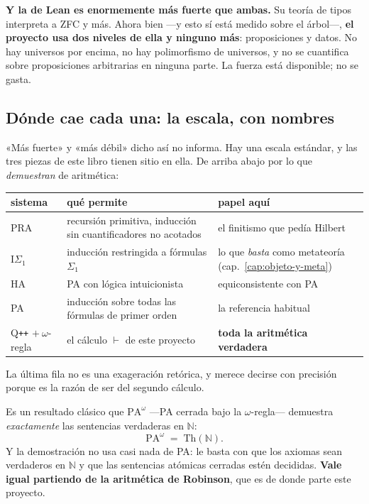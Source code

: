 \textbf{Y la de Lean es enormemente más fuerte que ambas.} Su teoría de tipos interpreta a ZFC y
más. Ahora bien —y esto sí está medido sobre el árbol—, \textbf{el proyecto usa dos niveles de ella
y ninguno más}: proposiciones y datos. No hay universos por encima, no hay polimorfismo de
universos, y no se cuantifica sobre proposiciones arbitrarias en ninguna parte. La fuerza está
disponible; no se gasta.

\subsection*{Dónde cae cada una: la escala, con nombres}

«Más fuerte» y «más débil» dicho así no informa. Hay una escala estándar, y las tres piezas de este
libro tienen sitio en ella. De arriba abajo por lo que \emph{demuestran} de aritmética:

\begin{center}\small
\begin{tabularx}{\linewidth}{@{}l >{\raggedright\arraybackslash}X l@{}}
\toprule
sistema & qué permite & papel aquí \\
\midrule
PRA & recursión primitiva, inducción sin cuantificadores no acotados & el finitismo que pedía Hilbert \\
$\mathrm{I}\Sigma_1$ & inducción restringida a fórmulas $\Sigma_1$ & lo que \emph{basta} como metateoría (cap.~\ref{cap:objeto-y-meta}) \\
HA & PA con lógica intuicionista & equiconsistente con PA \\
PA & inducción sobre todas las fórmulas de primer orden & la referencia habitual \\
Q\texttt{++} $+\ \omega$-regla & el cálculo $\vdash$ de este proyecto & \textbf{toda la aritmética verdadera} \\
\bottomrule
\end{tabularx}
\end{center}

La última fila no es una exageración retórica, y merece decirse con precisión porque es la razón
de ser del segundo cálculo.

\begin{matematica}
Es un resultado clásico que $\mathrm{PA}^{\omega}$ —PA cerrada bajo la $\omega$-regla— demuestra
\emph{exactamente} las sentencias verdaderas en $\mathbb{N}$:
\[ \mathrm{PA}^{\omega} \;=\; \mathrm{Th}(\mathbb{N}). \]
Y la demostración no usa casi nada de PA: le basta con que los axiomas sean verdaderos en
$\mathbb{N}$ y que las sentencias atómicas cerradas estén decididas. \textbf{Vale igual partiendo
de la aritmética de Robinson}, que es de donde parte este proyecto.
\end{matematica}

